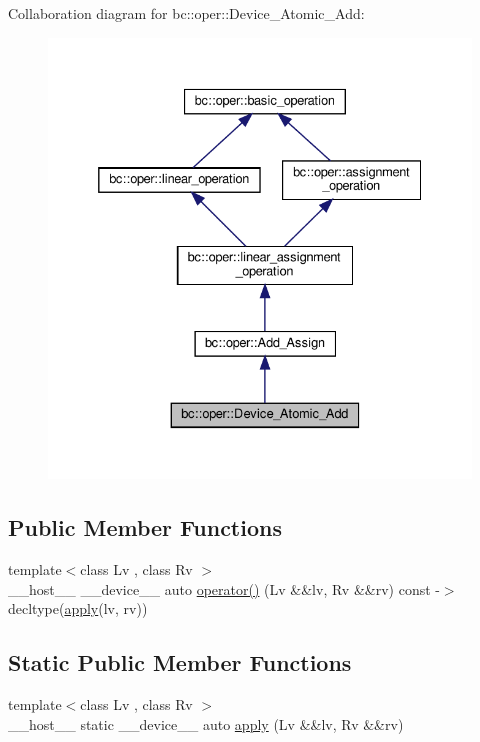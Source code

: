 Collaboration diagram for bc\+:\+:oper\+:\+:Device\+\_\+\+Atomic\+\_\+\+Add\+:\nopagebreak
\begin{figure}[H]
\begin{center}
\leavevmode
\includegraphics[width=332pt]{structbc_1_1oper_1_1Device__Atomic__Add__coll__graph}
\end{center}
\end{figure}
\subsection*{Public Member Functions}
\begin{DoxyCompactItemize}
\item 
{\footnotesize template$<$class Lv , class Rv $>$ }\\\+\_\+\+\_\+host\+\_\+\+\_\+ \+\_\+\+\_\+device\+\_\+\+\_\+ auto \hyperlink{structbc_1_1oper_1_1Device__Atomic__Add_a2013e78b39eb8092985d3462835ea7f9}{operator()} (Lv \&\&lv, Rv \&\&rv) const -\/$>$ decltype(\hyperlink{structbc_1_1oper_1_1Device__Atomic__Add_a8b5d52f08c719fcc876fd6627a865f8d}{apply}(lv, rv))
\end{DoxyCompactItemize}
\subsection*{Static Public Member Functions}
\begin{DoxyCompactItemize}
\item 
{\footnotesize template$<$class Lv , class Rv $>$ }\\\+\_\+\+\_\+host\+\_\+\+\_\+ static \+\_\+\+\_\+device\+\_\+\+\_\+ auto \hyperlink{structbc_1_1oper_1_1Device__Atomic__Add_a8b5d52f08c719fcc876fd6627a865f8d}{apply} (Lv \&\&lv, Rv \&\&rv)
\end{DoxyCompactItemize}
